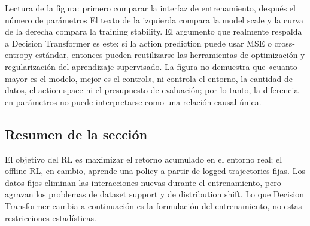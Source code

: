 \begin{knowledgebox}{Lectura de la figura: primero comparar la interfaz de entrenamiento, después el número de parámetros}
El texto de la izquierda compara la model scale y la curva de la derecha compara la training stability. El argumento que realmente respalda a Decision Transformer es este: si la action prediction puede usar MSE o cross-entropy estándar, entonces pueden reutilizarse las herramientas de optimización y regularización del aprendizaje supervisado. La figura no demuestra que «cuanto mayor es el modelo, mejor es el control», ni controla el entorno, la cantidad de datos, el action space ni el presupuesto de evaluación; por lo tanto, la diferencia en parámetros no puede interpretarse como una relación causal única.
\end{knowledgebox}


\subsection{Resumen de la sección}

El objetivo del RL es maximizar el retorno acumulado en el entorno real; el offline RL, en cambio, aprende una policy a partir de logged trajectories fijas. Los datos fijos eliminan las interacciones nuevas durante el entrenamiento, pero agravan los problemas de dataset support y de distribution shift. Lo que Decision Transformer cambia a continuación es la formulación del entrenamiento, no estas restricciones estadísticas.
